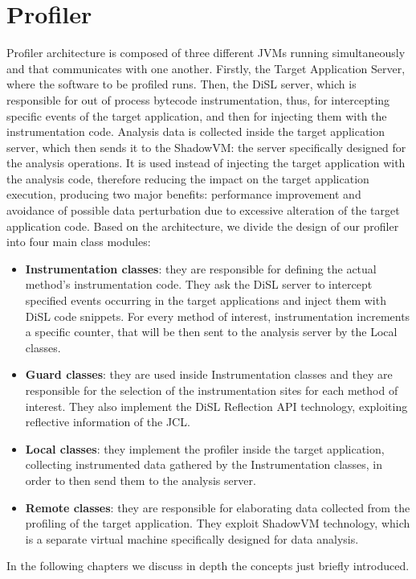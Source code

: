 \documentclass[]{usiinfthesis}
\begin{document}
\chapter{Profiler}
\large
Profiler architecture is composed of three different JVMs running simultaneously and that communicates with one another. Firstly, the Target Application Server, where the software to be profiled runs. Then, the DiSL server, which is responsible for out of process bytecode instrumentation, thus, for intercepting specific events of the target application, and then for injecting them with the instrumentation code. Analysis data is collected inside the target application server, which then sends it to the ShadowVM: the server specifically designed for the analysis operations. It is used instead of injecting the target application with the analysis code, therefore reducing the impact on the target application execution, producing two major benefits: performance improvement and avoidance of possible data perturbation due to excessive alteration of the target application code. Based on the architecture, we divide the design of our profiler into four main class modules:
\begin{itemize}
    \item \textbf{Instrumentation classes}: they are responsible for defining the actual method's instrumentation code. They ask the DiSL server to intercept specified events occurring in the target applications and inject them with DiSL code snippets. For every method of interest, instrumentation increments a specific counter, that will be then sent to the analysis server by the Local classes.
    \item \textbf{Guard classes}: they are used inside Instrumentation classes and they are responsible for the selection of the instrumentation sites for each method of interest. They also implement the DiSL Reflection API technology, exploiting reflective information of the JCL.
    \item \textbf{Local classes}: they implement the profiler inside the target application, collecting instrumented data gathered by the Instrumentation classes, in order to then send them to the analysis server.
    \item \textbf{Remote classes}: they are responsible for elaborating data collected from the profiling of the target application. They exploit ShadowVM technology, which is a separate virtual machine specifically designed for data analysis.
\end{itemize}
In the following chapters we discuss in depth the concepts just briefly introduced. 
\end{document}
